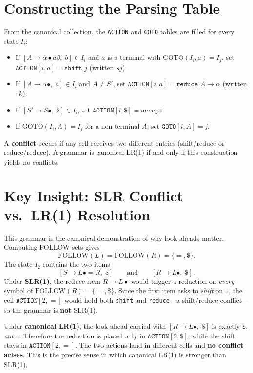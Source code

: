 \documentclass[11pt,a4paper]{report}
\begin{document}
\section{Constructing the Parsing Table}
From the canonical collection, the \texttt{ACTION} and \texttt{GOTO} tables are
filled for every state $I_i$:
\begin{itemize}
  \item If $[A \rightarrow \alpha \bullet a\beta,\; b] \in I_i$ and $a$ is a terminal with $\mathrm{GOTO}(I_i, a) = I_j$, set $\texttt{ACTION}[i, a] = \texttt{shift } j$ (written \texttt{s}$j$).
  \item If $[A \rightarrow \alpha \bullet,\; a] \in I_i$ and $A \neq S'$, set $\texttt{ACTION}[i, a] = \texttt{reduce } A \rightarrow \alpha$ (written \texttt{r}$k$).
  \item If $[S' \rightarrow S \bullet,\; \$] \in I_i$, set $\texttt{ACTION}[i, \$] = \texttt{accept}$.
  \item If $\mathrm{GOTO}(I_i, A) = I_j$ for a non-terminal $A$, set $\texttt{GOTO}[i, A] = j$.
\end{itemize}
A \textbf{conflict} occurs if any cell receives two different entries
(shift/reduce or reduce/reduce). A grammar is canonical LR(1) if and only if
this construction yields no conflicts.

\section{Key Insight: SLR Conflict vs.\ LR(1) Resolution}
This grammar is the canonical demonstration of why look-aheads matter. Computing
FOLLOW sets gives
\[
\mathrm{FOLLOW}(L) = \mathrm{FOLLOW}(R) = \{=, \$\}.
\]
The state $I_2$ contains the two items
\[
[S \rightarrow L \bullet = R,\; \$] \qquad\text{and}\qquad [R \rightarrow L \bullet,\; \$].
\]
Under \textbf{SLR(1)}, the reduce item $R \rightarrow L \bullet$ would trigger a
reduction on \emph{every} symbol of $\mathrm{FOLLOW}(R) = \{=, \$\}$. Since the
first item asks to \emph{shift} on \texttt{=}, the cell $\texttt{ACTION}[2, =]$
would hold both \texttt{shift} and \texttt{reduce}---a shift/reduce
conflict---so the grammar is \textbf{not} SLR(1).

Under \textbf{canonical LR(1)}, the look-ahead carried with
$[R \rightarrow L \bullet,\; \$]$ is exactly \texttt{\$}, \emph{not} \texttt{=}.
Therefore the reduction is placed only in $\texttt{ACTION}[2, \$]$, while the
shift stays in $\texttt{ACTION}[2, =]$. The two actions land in different cells
and \textbf{no conflict arises}. This is the precise sense in which canonical
LR(1) is stronger than SLR(1).
\end{document}
